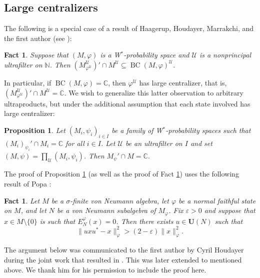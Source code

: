 \documentclass[12pt]{amsart}
\newtheorem{fact}[thm]{Fact}
\newtheorem{prop}[thm]{Proposition}
\theoremstyle{definition}
\newcommand{\C}{\mathbb{C}}
\def\bb{\mathbb}
\def\bb{\mathbb}
\def\cal{\mathcal}
\def\u{\mathsf 1}
\newcommand\cU{{\cal U}}
\def \u{\mathcal U}
\def\BC{\operatorname{BC}}
\begin{document}
\subsection{Large centralizers}

The following is a special case of a result of Haagerup, Houdayer, Marrakchi, and the first author (see \cite[Proposition 3.3]{AHHM20}):


\begin{fact}\label{p3.3}
Suppose that $(M,\varphi)$ is a W$^*$-probability space and $\u$ is a nonprincipal ultrafilter on $\mathbb N$.  Then $(M^{\u}_{\varphi^{\u}})'\cap M^{\u}\subseteq \BC(M,\varphi)^{\u}$.   
\end{fact}

In particular, if $\BC(M,\varphi)=\bb C$, then $\varphi^\u$ has large centralizer, that is, $(M^{\u}_{\varphi^\u})'\cap M^\u=\bb C$.  We wish to generalize this latter observation to arbitrary ultraproducts, but under the additional assumption that each state involved has large centralizer:

\begin{prop}\label{ultracyril}
    Let \((M_i,\psi_i)_{i\in I}\) be a family of W\(^*\)-probability spaces such that $(M_i)_{\psi_i}'\cap M_i=\bb C$ for all $i\in I$. Let \(\cU\) be an ultrafilter on \(I\) and set \((M,\psi)=\prod_{\cU}(M_i,\psi_i)\). Then \(M_{\psi}'\cap M=\C.\)  
\end{prop}

The proof of Proposition \ref{ultracyril} (as well as the proof of Fact \ref{p3.3}) uses the following result of Popa \cite[Lemma 2.3]{popa1981problem}:

\begin{fact}\label{lem: Popa81}
Let $M$ be a $\sigma$-finite von Neumann algebra, let $\varphi$ be a normal faithful state on $M$, and let $N$ be a von Neumann subalgebra of $M_{\varphi}$. Fix $\varepsilon>0$ and suppose that $x\in M\setminus \{0\}$ is such that $E_N^{\varphi}(x)=0$. Then there exists $u\in \mathbf{U}(N)$ such that 
\[\|uxu^*-x\|_{\varphi}^2>(2-\varepsilon)\|x\|_{\varphi}^2.\] 
\end{fact}

The argument below was  communicated to the first author by Cyril Houdayer during the joint work that resulted in \cite{AHHM20}. This was later extended to \cite[Proposition 3.3]{AHHM20}  mentioned above. We thank him for his permission to include the proof here.
\end{document}
